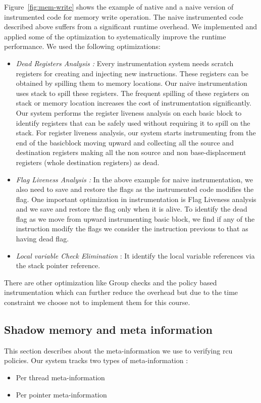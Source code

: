 Figure~\ref{fig:mem-write} shows the example of native and a naive version of instrumented code for memory write operation. The naive instrumented code described above suffers from a significant runtime overhead. We implemented and applied some of the optimization to systematically improve the runtime performance. We used the following optimizations: 
\begin{itemize}
	\item \emph{Dead Registers Analysis : }Every instrumentation system needs scratch registers for creating and injecting new instructions. These registers can be obtained by spilling them to memory locations. Our naive instrumentation uses stack to spill these registers. The frequent spilling of these registers on stack or memory location increases the cost of instrumentation significantly. Our system performs the register liveness analysis on each basic block to identify registers that can be safely used without requiring it to spill on the stack. For register liveness analysis, our system starts instrumenting from the end of the basicblock moving upward and collecting all the source and destination registers making all the non source and non base-displacement registers (whole destination registers) as dead.  
	\item \emph{Flag Liveness Analysis : } In the above example for naive instrumentation, we also need to save and restore the flags as the instrumented code modifies the flag. One important optimization in instrumentation is Flag Liveness analysis and we save and restore the flag only when it is alive. To identify the dead flag as we move from upward instrumenting basic block, we find if any of the instruction modify the flags we consider the instruction previous to that as having dead flag. 

	\item \emph{Local variable Check Elimination} :  It identify the local variable references via the stack pointer reference.
\end{itemize} 

There are other optimization like Group checks and the policy based instrumentation which can further reduce the overhead but due to the time constraint we choose not to implement them for this course.


\subsection{Shadow memory and meta information}
This section describes about the meta-information we use to verifying rcu policies. Our system tracks two types of meta-information :
\begin{itemize}
	\item Per thread meta-information
	\item Per pointer meta-information
\end{itemize} 

